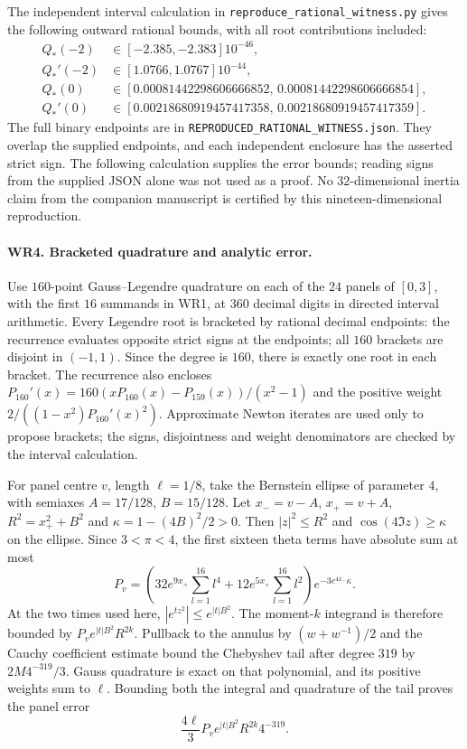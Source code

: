 The independent interval calculation in
\texttt{reproduce\_rational\_witness.py} gives the following outward
rational bounds, with all root contributions included:
\[
\begin{aligned}
Q_*(-2)&\in[-2.385,-2.383]10^{-46},\\
Q_*'(-2)&\in[1.0766,1.0767]10^{-44},\\
Q_*(0)&\in[0.00081442298606666852,\,0.00081442298606666854],\\
Q_*'(0)&\in[0.00218680919457417358,\,0.00218680919457417359].
\end{aligned}\tag{WR7}
\]
The full binary endpoints are in
\texttt{REPRODUCED\_RATIONAL\_WITNESS.json}. They overlap the
supplied endpoints, and each independent enclosure has the asserted
strict sign. The following calculation supplies the error bounds;
reading signs from the supplied JSON alone was not used as a proof.
No $32$-dimensional inertia claim from the companion manuscript is
certified by this nineteen-dimensional reproduction.

\paragraph{WR4. Bracketed quadrature and analytic error.}
Use $160$-point Gauss--Legendre quadrature on each of the $24$
panels of $[0,3]$, with the first $16$ summands in WR1, at
$360$ decimal digits in directed interval arithmetic. Every
Legendre root is bracketed by rational decimal endpoints: the
recurrence evaluates opposite strict signs at the endpoints;
all $160$ brackets are disjoint in $(-1,1)$. Since the degree is
$160$, there is exactly one root in each bracket. The recurrence
also encloses
$P_{160}'(x)=160(xP_{160}(x)-P_{159}(x))/(x^2-1)$ and the
positive weight $2/((1-x^2)P_{160}'(x)^2)$.
Approximate Newton iterates are used only to propose brackets;
the signs, disjointness and weight denominators are checked by
the interval calculation.

For panel centre $v$, length $\ell=1/8$, take the Bernstein
ellipse of parameter $4$, with semiaxes $A=17/128$, $B=15/128$.
Let $x_-=v-A$, $x_+=v+A$, $R^2=x_+^2+B^2$ and
$\kappa=1-(4B)^2/2>0$. Then $|z|^2\le R^2$ and
$\cos(4\Im z)\ge\kappa$ on the ellipse. Since $3<\pi<4$,
the first sixteen theta terms have absolute sum at most
\[
 P_v=\left(32e^{9x_+}\sum_{l=1}^{16}l^4
              +12e^{5x_+}\sum_{l=1}^{16}l^2\right)
                      e^{-3e^{4x_-}\kappa}.
 \tag{WR8}
\]
At the two times used here, $|e^{tz^2}|\le e^{|t|B^2}$.
The moment-$k$ integrand is therefore bounded by
$P_ve^{|t|B^2}R^{2k}$. Pullback to the annulus by
$(w+w^{-1})/2$ and the Cauchy coefficient estimate bound the
Chebyshev tail after degree $319$ by $2M4^{-319}/3$.
Gauss quadrature is exact on that polynomial, and its positive
weights sum to $\ell$. Bounding both the integral and quadrature
of the tail proves the panel error
\[
 \frac{4\ell}{3}P_ve^{|t|B^2}R^{2k}4^{-319}.
 \tag{WR9}
\]

